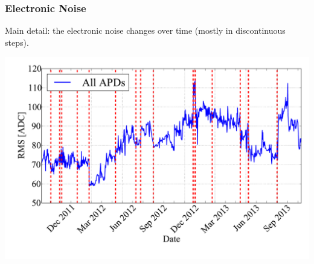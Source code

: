 \documentclass{beamer}
\begin{document}
\begin{frame}
\begin{center}
\frametitle{Electronic Noise}
\end{center}
\vspace{1cm}
Main detail: the electronic noise changes over time (mostly in discontinuous steps).
\begin{center}
\includegraphics[keepaspectratio=true,width=\textwidth,clip=true,trim=5mm 0mm 0mm 0mm]{APDNoiseVsActions_sumall.pdf}
\end{center}
\end{frame}
\end{document}
